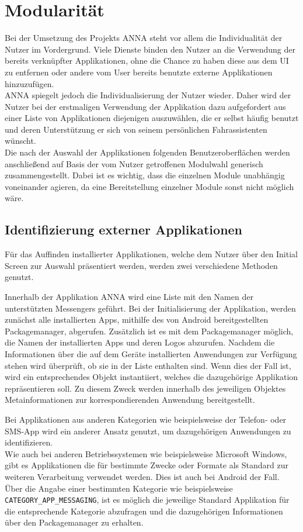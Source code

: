 \section{Modularität}
Bei der Umsetzung des Projekts \ac{ANNA} steht vor allem die Individualität der Nutzer im Vordergrund. Viele Dienste binden den Nutzer an die Verwendung der bereits verknüpfter Applikationen, ohne die Chance zu haben diese aus dem \ac{UI} zu entfernen oder andere vom User bereits benutzte externe Applikationen hinzuzufügen.\\
\ac{ANNA} spiegelt jedoch die Individualisierung der Nutzer wieder. Daher wird der Nutzer bei der erstmaligen Verwendung der Applikation dazu aufgefordert aus einer Liste von Applikationen diejenigen auszuwählen, die er selbst häufig benutzt und deren Unterstützung er sich von seinem persönlichen Fahrassistenten wünscht.\\
Die nach der Auswahl der Applikationen folgenden Benutzeroberflächen werden anschließend auf Basis der vom Nutzer getroffenen Modulwahl generisch zusammengestellt. Dabei ist es wichtig, dass die einzelnen Module unabhängig voneinander agieren, da eine Bereitstellung einzelner Module sonst nicht möglich wäre.

\subsection{Identifizierung externer Applikationen}
\label{installedApps}
Für das Auffinden installierter Applikationen, welche dem Nutzer über den Initial Screen zur Auswahl präsentiert werden, werden zwei verschiedene Methoden genutzt.

Innerhalb der Applikation \ac{ANNA} wird eine Liste mit den Namen der unterstützten Messengers geführt. Bei der Initialisierung der Applikation, werden zunächst alle installierten Apps, mithilfe des von Android bereitgestellten Packagemanager, abgerufen. Zusätzlich ist es mit dem Packagemanager möglich, die Namen der installierten Apps und deren Logos abzurufen. Nachdem die Informationen über die auf dem Geräte installierten Anwendungen zur Verfügung stehen wird überprüft, ob sie in der Liste enthalten sind. Wenn dies der Fall ist, wird ein entsprechendes Objekt instantiiert, welches die dazugehörige Applikation repräsentieren soll. Zu diesem Zweck werden innerhalb des jeweiligen Objektes Metainformationen zur korrespondierenden Anwendung bereitgestellt.

Bei Applikationen aus anderen Kategorien wie beispielsweise der Telefon- oder SMS-App wird ein anderer Ansatz genutzt, um dazugehörigen Anwendungen zu identifizieren.\\
Wie auch bei anderen Betriebssystemen wie beispielsweise Microsoft Windows, gibt es Applikationen die für bestimmte Zwecke oder Formate als Standard zur weiteren Verarbeitung verwendet werden. Dies ist auch bei Android der Fall. Über die Angabe einer bestimmten Kategorie wie beispielsweise \texttt{CATEGORY\_APP\_MESSAGING}, ist es möglich die jeweilige Standard Applikation für die entsprechende Kategorie abzufragen und die dazugehörigen Informationen über den Packagemanager zu erhalten.

